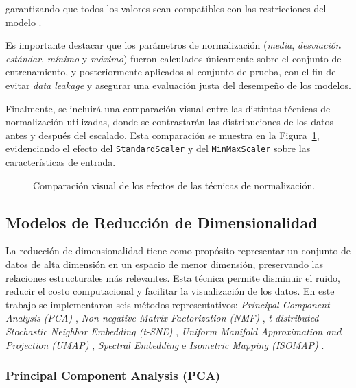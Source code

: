 \documentclass[conference]{IEEEtran}
\begin{document}
garantizando que todos los valores sean compatibles con las restricciones del modelo \cite{lee1999learning}.

Es importante destacar que los parámetros de normalización (\textit{media}, \textit{desviación estándar}, \textit{mínimo} y \textit{máximo}) fueron calculados únicamente sobre el conjunto de entrenamiento, y posteriormente aplicados al conjunto de prueba, con el fin de evitar \textit{data leakage} y asegurar una evaluación justa del desempeño de los modelos.

Finalmente, se incluirá una comparación visual entre las distintas técnicas de normalización utilizadas, donde se contrastarán las distribuciones de los datos antes y después del escalado. Esta comparación se muestra en la Figura~\ref{fig:normalization_comparison}, evidenciando el efecto del \texttt{StandardScaler} y del \texttt{MinMaxScaler} sobre las características de entrada.


\begin{figure}[H]
    \centering
    
    \caption{Comparación visual de los efectos de las técnicas de normalización.}
\label{fig:normalization_comparison}
\end{figure}




\subsection{Modelos de Reducción de Dimensionalidad}

La reducción de dimensionalidad tiene como propósito representar un conjunto de datos de alta dimensión en un espacio de menor dimensión, preservando las relaciones estructurales más relevantes. Esta técnica permite disminuir el ruido, reducir el costo computacional y facilitar la visualización de los datos. En este trabajo se implementaron seis métodos representativos: \textit{Principal Component Analysis (PCA)} \cite{jolliffe2016principal}, \textit{Non-negative Matrix Factorization (NMF)} \cite{lee1999learning}, \textit{t-distributed Stochastic Neighbor Embedding (t-SNE)} \cite{maaten2008tsne}, \textit{Uniform Manifold Approximation and Projection (UMAP)} \cite{mcinnes2018umap}, \textit{Spectral Embedding} \cite{belkin2003laplacian} e \textit{Isometric Mapping (ISOMAP)} \cite{tenenbaum2000isomap}.

\subsubsection{Principal Component Analysis (PCA)}
\end{document}

